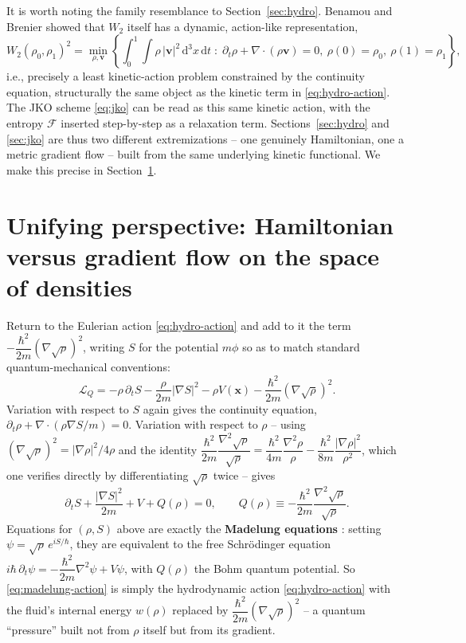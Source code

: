 \documentclass[11pt]{article}
\newcommand{\rd}{\mathrm{d}}
\newcommand{\lap}{\nabla^2}
\newcommand{\bv}{\mathbf{v}}
\newcommand{\bx}{\mathbf{x}}
\begin{document}
It is worth noting the family resemblance to Section~\ref{sec:hydro}. Benamou and Brenier \cite{BenamouBrenier2000} showed that $W_2$ itself has a dynamic, action-like representation,
\begin{equation}
W_2(\rho_0,\rho_1)^2 = \min_{\rho,\bv} \left\{ \int_0^1\!\!\int \rho\,|\bv|^2\,\rd^3x\,\rd t \;:\; \partial_t\rho + \nabla\cdot(\rho\bv)=0,\ \rho(0)=\rho_0,\ \rho(1)=\rho_1\right\},
\end{equation}
i.e., precisely a least kinetic-action problem constrained by the continuity equation, structurally the same object as the kinetic term in \eqref{eq:hydro-action}. The JKO scheme \eqref{eq:jko} can be read as this same kinetic action, with the entropy $\mathcal F$ inserted step-by-step as a relaxation term. Sections~\ref{sec:hydro} and \ref{sec:jko} are thus two different extremizations -- one genuinely Hamiltonian, one a metric gradient flow -- built from the same underlying kinetic functional. We make this precise in Section~\ref{sec:unification}.

\section{Unifying perspective: Hamiltonian versus gradient flow on the space of densities}
\label{sec:unification}

Return to the Eulerian action \eqref{eq:hydro-action} and add to it the term $-\dfrac{\hbar^2}{2m}(\nabla\sqrt\rho)^2$, writing $S$ for the potential $m\phi$ so as to match standard quantum-mechanical conventions:
\begin{equation}
\mathcal L_Q = -\rho\,\partial_t S - \frac{\rho}{2m}|\nabla S|^2 - \rho V(\bx) - \frac{\hbar^2}{2m}(\nabla\sqrt\rho)^2. \label{eq:madelung-action}
\end{equation}
Variation with respect to $S$ again gives the continuity equation, $\partial_t\rho + \nabla\cdot(\rho\nabla S/m)=0$. Variation with respect to $\rho$ -- using $(\nabla\sqrt\rho)^2 = |\nabla\rho|^2/4\rho$ and the identity $\dfrac{\hbar^2}{2m}\dfrac{\lap\sqrt\rho}{\sqrt\rho} = \dfrac{\hbar^2}{4m}\dfrac{\lap\rho}{\rho} - \dfrac{\hbar^2}{8m}\dfrac{|\nabla\rho|^2}{\rho^2}$, which one verifies directly by differentiating $\sqrt\rho$ twice -- gives
\begin{equation}
\partial_t S + \frac{|\nabla S|^2}{2m} + V + Q(\rho) = 0, \qquad Q(\rho) \equiv -\frac{\hbar^2}{2m}\frac{\lap\sqrt\rho}{\sqrt\rho}. \label{eq:madelung-hj}
\end{equation}
Equations for $(\rho,S)$ above are exactly the \textbf{Madelung equations} \cite{Madelung1927}: setting $\psi = \sqrt\rho\,e^{iS/\hbar}$, they are equivalent to the free Schr\"odinger equation $i\hbar\,\partial_t\psi = -\dfrac{\hbar^2}{2m}\lap\psi + V\psi$, with $Q(\rho)$ the Bohm quantum potential. So \eqref{eq:madelung-action} is simply the hydrodynamic action \eqref{eq:hydro-action} with the fluid's internal energy $w(\rho)$ replaced by $\dfrac{\hbar^2}{2m}(\nabla\sqrt\rho)^2$ -- a quantum ``pressure'' built not from $\rho$ itself but from its gradient.
\end{document}
